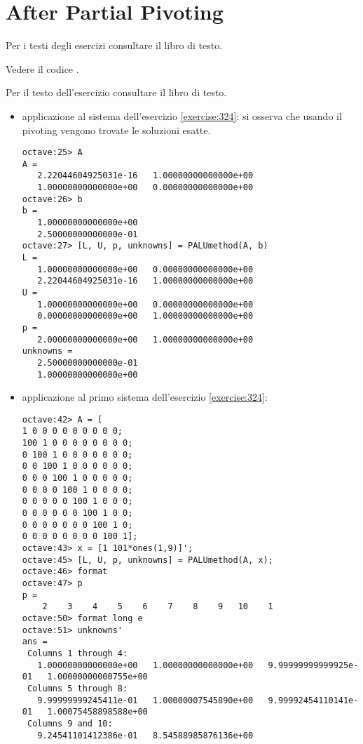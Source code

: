 \section{After Partial Pivoting}

\begin{exercise}[3.21, 3.22]
Per i testi degli esercizi consultare il libro di testo.
\end{exercise}
Vedere il codice .

\begin{exercise}[3.23]
Per il testo dell'esercizio consultare il libro di testo.
\end{exercise}
\begin{itemize}
  \item applicazione al sistema dell'esercizio \ref{exercise:324}: si
osserva che usando il pivoting vengono trovate le soluzioni esatte.
\begin{lstlisting}
octave:25> A
A =
   2.22044604925031e-16   1.00000000000000e+00
   1.00000000000000e+00   0.00000000000000e+00
octave:26> b
b =
   1.00000000000000e+00
   2.50000000000000e-01
octave:27> [L, U, p, unknowns] = PALUmethod(A, b)
L =
   1.00000000000000e+00   0.00000000000000e+00
   2.22044604925031e-16   1.00000000000000e+00
U =
   1.00000000000000e+00   0.00000000000000e+00
   0.00000000000000e+00   1.00000000000000e+00
p =
   2.00000000000000e+00   1.00000000000000e+00
unknowns =
   2.50000000000000e-01
   1.00000000000000e+00
\end{lstlisting}

\item applicazione al primo sistema dell'esercizio \ref{exercise:324}:
\begin{lstlisting}
octave:42> A = [ 
1 0 0 0 0 0 0 0 0 0; 
100 1 0 0 0 0 0 0 0 0; 
0 100 1 0 0 0 0 0 0 0; 
0 0 100 1 0 0 0 0 0 0; 
0 0 0 100 1 0 0 0 0 0; 
0 0 0 0 100 1 0 0 0 0; 
0 0 0 0 0 100 1 0 0 0; 
0 0 0 0 0 0 100 1 0 0; 
0 0 0 0 0 0 0 100 1 0; 
0 0 0 0 0 0 0 0 100 1];
octave:43> x = [1 101*ones(1,9)]';
octave:45> [L, U, p, unknowns] = PALUmethod(A, x);
octave:46> format
octave:47> p
p =
    2    3    4    5    6    7    8    9   10    1
octave:50> format long e
octave:51> unknowns'
ans =
 Columns 1 through 4:
   1.00000000000000e+00   1.00000000000000e+00   9.99999999999925e-01   1.00000000000755e+00
 Columns 5 through 8:
   9.99999999245411e-01   1.00000007545890e+00   9.99992454110141e-01   1.00075458898588e+00
 Columns 9 and 10:
   9.24541101412386e-01   8.54588985876136e+00
\end{lstlisting}


\end{itemize}

